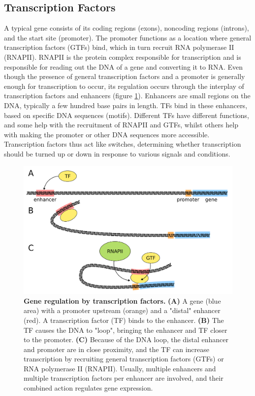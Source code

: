 \subsection{Transcription Factors}

A typical gene consists of its coding regions (exons), noncoding regions (introns), and the start site (promoter). The promoter functions as a location where general transcription factors (GTFs) bind, which in turn recruit RNA polymerase II (RNAPII). RNAPII is the protein complex responsible for transcription and is responsible for reading out the DNA of a gene and converting it to RNA. Even though the presence of general transcription factors and a promoter is generally enough for transcription to occur\cite{Haberle2018}, its regulation occurs through the interplay of transcription factors and enhancers (figure \ref{fig:TF}). Enhancers are small regions on the DNA, typically a few hundred base pairs in length. TFs bind in these enhancers, based on specific DNA sequences (motifs). Different TFs have different functions, and some help with the recruitment of RNAPII and GTFs, whilst others help with making the promoter or other DNA sequences more accessible. Transcription factors thus act like switches, determining whether transcription should be turned up or down in response to various signals and conditions.

\begin{figure}[h]
    \center
    \includegraphics[width=0.8\linewidth]{ch.introduction/imgs/transcription_factor.png}
    \caption{\textbf{Gene regulation by transcription factors.} \textbf{(A)} A gene (blue area) with a promoter upstream (orange) and a "distal" enhancer (red). A transcription factor (TF) binds to the enhancer. \textbf{(B)} The TF causes the DNA to "loop", bringing the enhancer and TF closer to the promoter. \textbf{(C)} Because of the DNA loop, the distal enhancer and promoter are in close proximity, and the TF can increase transcription by recruiting general transcription factors (GTFs) or RNA polymerase II (RNAPII). Usually, multiple enhancers and multiple transcription factors per enhancer are involved, and their combined action regulates gene expression.}
    \label{fig:TF}
\end{figure}

